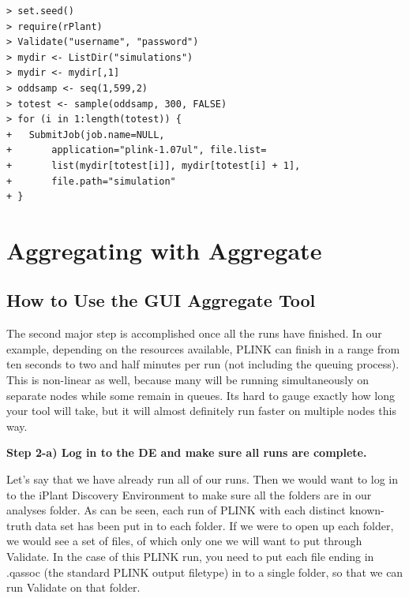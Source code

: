 \documentclass[twoside,a4paper]{refart}
\begin{document}
\begin{center}
\begin{lstlisting}[frame=single]
> set.seed()
> require(rPlant) 
> Validate("username", "password")
> mydir <- ListDir("simulations")
> mydir <- mydir[,1]
> oddsamp <- seq(1,599,2)
> totest <- sample(oddsamp, 300, FALSE)
> for (i in 1:length(totest)) {
+ 	SubmitJob(job.name=NULL, 
+		application="plink-1.07ul", file.list=
+		list(mydir[totest[i]], mydir[totest[i] + 1],
+		file.path="simulation"
+ }
\end{lstlisting}
\end{center}


\section{Aggregating with Aggregate}

\subsection{How to Use the GUI Aggregate Tool}
The second major step is accomplished once all the runs have finished. In our example, depending on the resources available, PLINK can finish in a range from ten seconds to two and half minutes per run (not including the queuing process). This is non-linear as well, because many will be running simultaneously on separate nodes while some remain in queues. Its hard to gauge exactly how long your tool will take, but it will almost definitely run faster on multiple nodes this way.

\textbf{Step 2-a) Log in to the DE and make sure all runs are complete.}

Let's say that we have already run all of our runs. Then we would want to log in to the iPlant Discovery Environment to make sure all the folders are in our analyses folder. As can be seen, each run of PLINK with each distinct known-truth data set has been put in to each folder. If we were to open up each folder, we would see a set of files, of which only one we will want to put through Validate. In the case of this PLINK run, you need to put each file ending in .qassoc (the standard PLINK output filetype) in to a single folder, so that we can run Validate on that folder. 
\end{document}
